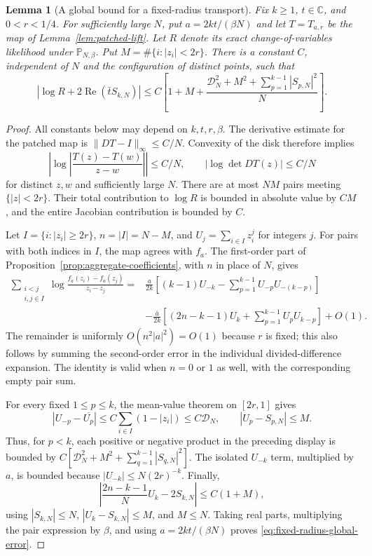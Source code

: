 \documentclass[11pt,a4paper]{article}
\numberwithin{equation}{section}
\newtheorem{lemma}[theorem]{Lemma}
\theoremstyle{definition}
\theoremstyle{remark}
\newcommand{\Pbb}{\mathbb P}
\newcommand{\C}{\mathbb C}
\begin{document}
\begin{lemma}[A global bound for a fixed-radius transport]
\label{lem:fixed-radius-loglikelihood-bound}
Fix $k\geq1$, $t\in\C$, and $0<r<1/4$. For sufficiently large $N$,
put $a=2kt/(\beta N)$ and let $T=T_{a,r}$ be the map of
Lemma~\ref{lem:patched-lift}. Let $R$ denote its exact change-of-variables
likelihood under $\Pbb_{N,\beta}$. Put
$M=\#\{i:|z_i|<2r\}$. There is a constant $C$, independent of $N$
and the configuration of distinct points, such that
\begin{equation}\label{eq:fixed-radius-global-error}
 \left|\log R+2\operatorname{Re}(\bar t S_{k,N})\right|
 \leq C\left[1+M+
   \frac{\mathcal D_N^2+M^2+
                     \sum_{p=1}^{k-1}|S_{p,N}|^2}{N}\right].
\end{equation}
\end{lemma}
\begin{proof}
All constants below may depend on $k,t,r,\beta$. The derivative estimate
for the patched map is $\|DT-I\|_\infty\leq C/N$. Convexity of the disk
therefore implies
\[
 \left|\log\left|\frac{T(z)-T(w)}{z-w}\right|\right|\leq C/N,
 \qquad |\log\det DT(z)|\leq C/N
\]
for distinct $z,w$ and sufficiently large $N$. There are at most $NM$
pairs meeting $\{|z|<2r\}$. Their total contribution to $\log R$ is
bounded in absolute value by $CM$, and the entire Jacobian contribution
is bounded by $C$.

Let $I=\{i:|z_i|\geq2r\}$, $n=|I|=N-M$, and
$U_j=\sum_{i\in I}z_i^j$ for integers $j$. For pairs with both indices
in $I$, the map agrees with $f_a$. The first-order part of
Proposition~\ref{prop:aggregate-coefficients}, with $n$ in place of $N$,
gives
\begin{align*}
 \sum_{\substack{i<j\\i,j\in I}}
   \log\frac{f_a(z_i)-f_a(z_j)}{z_i-z_j}
 ={}&\frac{a}{2k}
       \left[(k-1)U_{-k}-\sum_{p=1}^{k-1}U_{-p}U_{-(k-p)}\right]\\
 &-\frac{\bar a}{2k}
       \left[(2n-k-1)U_k+\sum_{p=1}^{k-1}U_pU_{k-p}\right]+O(1).
\end{align*}
The remainder is uniformly $O(n^2|a|^2)=O(1)$ because $r$ is fixed;
this also follows by summing the second-order error in the individual
divided-difference expansion. The identity is valid when $n=0$ or $1$
as well, with the corresponding empty pair sum.

For every fixed $1\leq p\leq k$, the mean-value theorem on $[2r,1]$
gives
\[
 |U_{-p}-\overline{U_p}|
 \leq C\sum_{i\in I}(1-|z_i|)\leq C\mathcal D_N,
 \qquad |U_p-S_{p,N}|\leq M.
\]
Thus, for $p<k$, each positive or negative product in the preceding
display is bounded by
$C[\mathcal D_N^2+M^2+\sum_{q=1}^{k-1}|S_{q,N}|^2]$.
The isolated $U_{-k}$ term, multiplied by $a$, is bounded because
$|U_{-k}|\leq N(2r)^{-k}$. Finally,
\[
 \left|\frac{2n-k-1}{N}U_k-2S_{k,N}\right|
 \leq C(1+M),
\]
using $|S_{k,N}|\leq N$, $|U_k-S_{k,N}|\leq M$, and $M\leq N$.
Taking real parts, multiplying the pair expression by $\beta$, and
using $a=2kt/(\beta N)$ proves
\eqref{eq:fixed-radius-global-error}.
\end{proof}
\end{document}
